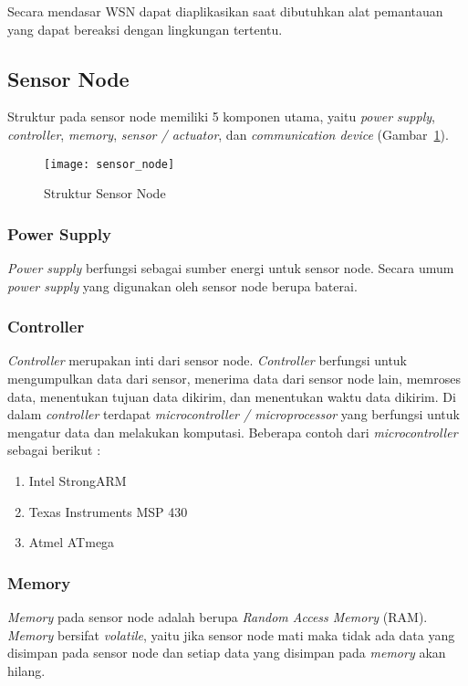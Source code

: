 Secara mendasar WSN dapat diaplikasikan saat dibutuhkan alat pemantauan yang dapat bereaksi dengan lingkungan tertentu.

\subsection{Sensor Node \cite{holger:0:protchitect}}
\label{subsec:sensorNode} 
Struktur pada sensor node memiliki 5 komponen utama, yaitu {\it power supply}, {\it controller}, {\it memory}, {\it sensor / actuator}, dan {\it communication device}  (Gambar~\ref{fig:sensor_node}).

\begin{figure} [H]
	\centering  
	\texttt{[image: sensor\_node]}  
	\caption[Struktur Sensor Node]{Struktur Sensor Node} 
	\label{fig:sensor_node} 
\end{figure} 

\subsubsection{Power Supply}
{\it Power supply} berfungsi sebagai sumber energi untuk sensor node. Secara umum {\it power supply} yang digunakan oleh sensor node berupa baterai.

\subsubsection{Controller}
{\it Controller} merupakan inti dari sensor node. {\it Controller} berfungsi untuk mengumpulkan data dari sensor, menerima data dari sensor node lain, memroses data, menentukan tujuan data dikirim, dan menentukan waktu data dikirim. Di dalam {\it controller} terdapat {\it microcontroller / microprocessor} yang berfungsi untuk mengatur data dan melakukan komputasi. Beberapa contoh dari {\it microcontroller} sebagai berikut : 
	\begin{enumerate}
		\item Intel StrongARM
		\item Texas Instruments MSP 430
		\item Atmel ATmega
	\end{enumerate}
			
\subsubsection{Memory}
{\it Memory} pada sensor node adalah berupa {\it Random Access Memory} (RAM). {\it Memory} bersifat {\it volatile}, yaitu jika sensor node mati maka tidak ada data yang disimpan pada  sensor node dan setiap data yang disimpan pada {\it memory} akan hilang.

